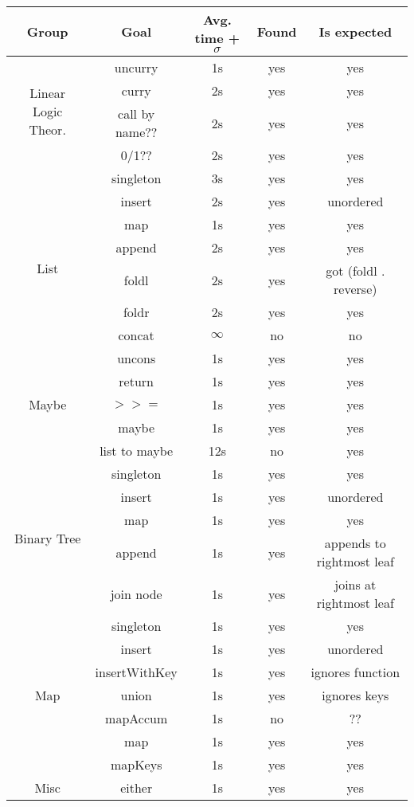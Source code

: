 \documentclass{llncs}
\begin{document}
\begin{center}
    \begin{tabular}{ |c|c|c|c|c| }
        \hline
        Group & Goal & Avg. time + $\sigma$ & Found & Is expected \\
        \hline
        \multirow{4}{4em}{Linear Logic Theor.} & uncurry & 1s & yes & yes \\ 
        & curry & 2s & yes & yes \\ 
        & call by name?? & 2s & yes & yes \\ 
        & 0/1?? & 2s & yes & yes \\ 
        \hline
        \multirow{8}{4em}{List} & singleton & 3s & yes & yes \\ 
        & insert & 2s & yes & unordered \\ 
        & map & 1s & yes & yes \\ 
        & append & 2s & yes & yes \\ 
        & foldl & 2s & yes & got (foldl . reverse) \\ 
        & foldr & 2s & yes & yes \\ 
        & concat & $\infty$ & no & no \\ 
        & uncons & 1s & yes & yes \\
        \hline
        \multirow{3}{4em}{Maybe} & return & 1s & yes & yes \\ 
        & $>>=$ & 1s & yes & yes \\
        & maybe & 1s & yes & yes \\
        & list to maybe & 12s & no & yes \\
        \hline
        \multirow{5}{4em}{Binary Tree} & singleton & 1s & yes & yes \\ 
        & insert & 1s & yes & unordered \\
        & map & 1s & yes & yes \\
        & append & 1s & yes & appends to rightmost leaf \\
        & join node & 1s & yes & joins at rightmost leaf \\
        \hline
        \multirow{7}{4em}{Map} & singleton & 1s & yes & yes \\ 
        & insert & 1s & yes & unordered \\
        & insertWithKey & 1s & yes & ignores function \\
        & union & 1s & yes & ignores keys \\
        & mapAccum & 1s & no & ?? \\
        & map & 1s & yes & yes \\
        & mapKeys & 1s & yes & yes \\
        \hline
        \multirow{1}{4em}{Misc} & either & 1s & yes & yes \\ 
        \hline
    \end{tabular}
\end{center}
\end{document}
